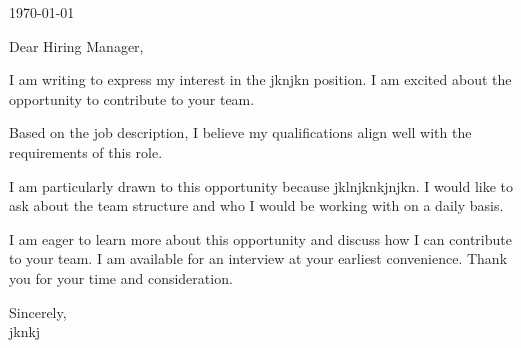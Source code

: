 \documentclass[letterpaper,11pt]{article}
\begin{document}
\today \\
\vspace{20pt}

Dear Hiring Manager, \\
\vspace{10pt}

I am writing to express my interest in the jknjkn position. I am excited about the opportunity to contribute to your team.
\vspace{10pt}

Based on the job description, I believe my qualifications align well with the requirements of this role.
\vspace{10pt}

I am particularly drawn to this opportunity because jklnjknkjnjkn. I would like to ask about the team structure and who I would be working with on a daily basis.
\vspace{10pt}

I am eager to learn more about this opportunity and discuss how I can contribute to your team. I am available for an interview at your earliest convenience. Thank you for your time and consideration.
\vspace{20pt}

Sincerely, \\
\vspace{40pt} %
jknkj

\end{document}
